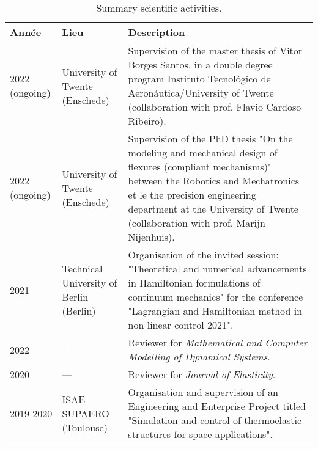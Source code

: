 \documentclass[12pt]{article}
\begin{document}
	\begin{table}[h]
		\centering
		\begin{tabular}{p{}p{}p{}}
			\hline
			Année & Lieu & Description  \\
			\hline
			2022 (ongoing) & University of Twente (Enschede) & Supervision of the master thesis of Vitor Borges Santos, in a double degree program  Instituto Tecnológico de Aeronáutica/University of Twente (collaboration with prof. Flavio Cardoso Ribeiro). \\
			2022 (ongoing) & University of Twente (Enschede) & Supervision of the PhD thesis "On the modeling and mechanical design of flexures (compliant mechanisms)" between the Robotics and Mechatronics et le the precision engineering department at the University of Twente (collaboration with prof. Marijn Nijenhuis). \\
			\hline
			2021  & Technical University of Berlin (Berlin) & Organisation of the invited session: "Theoretical and numerical advancements in Hamiltonian formulations of continuum mechanics" for the conference "Lagrangian and Hamiltonian method in non linear control 2021". \\
			\hline
			2022 & --- & Reviewer for \textit{Mathematical and Computer Modelling of Dynamical Systems}. \\
			2020 & --- & Reviewer for \textit{Journal of Elasticity}. \\
			\hline
			2019-2020 & ISAE-SUPAERO (Toulouse) & Organisation and supervision of an Engineering and Enterprise Project titled  "Simulation and control of thermoelastic structures for space applications". \\
			\hline
		\end{tabular}
		\caption{Summary scientific activities.}
		\label{tab:activites}
	\end{table}
	
\end{document}

